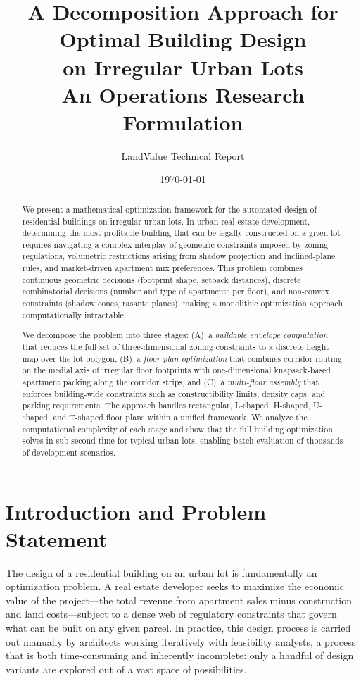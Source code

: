 \documentclass[11pt,a4paper]{article}
\title{\textbf{A Decomposition Approach for Optimal Building Design\\on Irregular Urban Lots}\\[0.5em]
\large An Operations Research Formulation}
\author{LandValue Technical Report}
\date{\today}
\begin{document}
\maketitle

\begin{abstract}
We present a mathematical optimization framework for the automated design of
residential buildings on irregular urban lots. In urban real estate
development, determining the most profitable building that can be legally
constructed on a given lot requires navigating a complex interplay of
geometric constraints imposed by zoning regulations, volumetric restrictions
arising from shadow projection and inclined-plane rules, and market-driven
apartment mix preferences. This problem combines continuous geometric
decisions (footprint shape, setback distances), discrete combinatorial
decisions (number and type of apartments per floor), and non-convex
constraints (shadow cones, rasante planes), making a monolithic optimization
approach computationally intractable.

We decompose the problem into three stages: (A)~a \emph{buildable envelope
computation} that reduces the full set of three-dimensional zoning constraints
to a discrete height map over the lot polygon, (B)~a \emph{floor plan
optimization} that combines corridor routing on the medial axis of irregular
floor footprints with one-dimensional knapsack-based apartment packing along
the corridor strips, and (C)~a \emph{multi-floor assembly} that enforces
building-wide constraints such as constructibility limits, density caps, and
parking requirements. The approach handles rectangular, L-shaped, H-shaped,
U-shaped, and T-shaped floor plans within a unified framework. We analyze the
computational complexity of each stage and show that the full building
optimization solves in sub-second time for typical urban lots, enabling
batch evaluation of thousands of development scenarios.
\end{abstract}

\tableofcontents
\newpage

\section{Introduction and Problem Statement}\label{sec:intro}

The design of a residential building on an urban lot is fundamentally an
optimization problem. A real estate developer seeks to maximize the economic
value of the project---the total revenue from apartment sales minus
construction and land costs---subject to a dense web of regulatory
constraints that govern what can be built on any given parcel. In practice,
this design process is carried out manually by architects working
iteratively with feasibility analysts, a process that is both
time-consuming and inherently incomplete: only a handful of design variants
are explored out of a vast space of possibilities.
\end{document}
